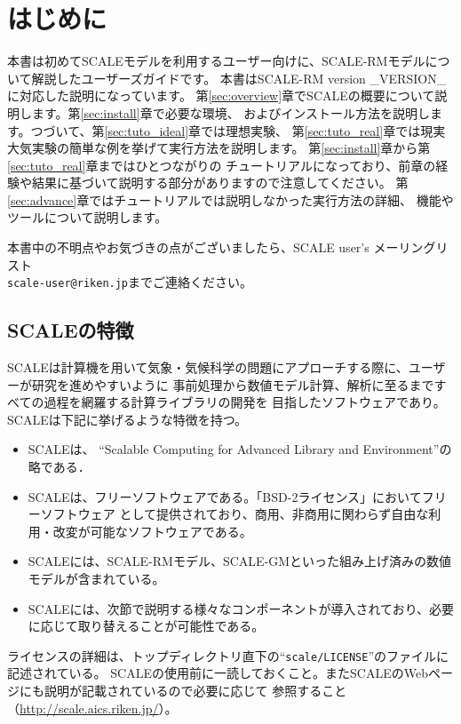 \section{はじめに}

本書は初めてSCALEモデルを利用するユーザー向けに、SCALE-RMモデルについて解説したユーザーズガイドです。
本書はSCALE-RM version _VERSION_ に対応した説明になっています。
第\ref{sec:overview}章でSCALEの概要について説明します。第\ref{sec:install}章で必要な環境、
およびインストール方法を説明します。つづいて、第\ref{sec:tuto_ideal}章では理想実験、
第\ref{sec:tuto_real}章では現実大気実験の簡単な例を挙げて実行方法を説明します。
第\ref{sec:install}章から第\ref{sec:tuto_real}章まではひとつながりの
チュートリアルになっており、前章の経験や結果に基づいて説明する部分がありますので注意してください。
第\ref{sec:advance}章ではチュートリアルでは説明しなかった実行方法の詳細、
機能やツールについて説明します。

本書中の不明点やお気づきの点がございましたら、SCALE user's メーリングリスト\\
 \verb|scale-user@riken.jp|までご連絡ください。



\subsection{SCALEの特徴}
SCALEは計算機を用いて気象・気候科学の問題にアプローチする際に、ユーザーが研究を進めやすいように
事前処理から数値モデル計算、解析に至るまですべての過程を網羅する計算ライブラリの開発を
目指したソフトウェアであり。SCALEは下記に挙げるような特徴を持つ。
\begin{itemize}
\item SCALEは、 ``Scalable Computing for Advanced Library and Environment''の略である．
\item SCALEは、フリーソフトウェアである。「BSD-2ライセンス」においてフリーソフトウェア
として提供されており、商用、非商用に関わらず自由な利用・改変が可能なソフトウェアである。
\item SCALEには、SCALE-RMモデル、SCALE-GMといった組み上げ済みの数値モデルが含まれている。
\item SCALEには、次節で説明する様々なコンポーネントが導入されており、必要に応じて取り替えることが可能性である。
\end{itemize}

ライセンスの詳細は、トップディレクトリ直下の``\verb|scale/LICENSE|''のファイルに記述されている。
SCALEの使用前に一読しておくこと。またSCALEのWebページにも説明が記載されているので必要に応じて
参照すること（\url{http://scale.aics.riken.jp/}）。

